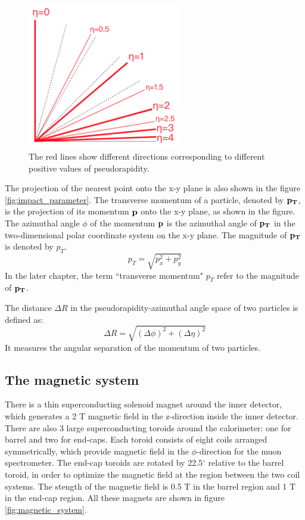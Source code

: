 \begin{figure}
\centering
\includegraphics[width=0.6\textwidth]{data/photo/detector/pseudorapidity.png}
\caption{The red lines show different directions corresponding to different positive values of pseudorapidity. \cite{pseudorapidity}}
\label{fig:pseudorapidity}
\end{figure}

The projection of the nearest point onto the x-y plane is also shown in the figure \ref{fig:impact_parameter}.
The transverse momentum of a particle, denoted by $\bf{p}_T$, is the projection of its momentum $\bf{p}$ onto the x-y plane, as shown in the figure.
The azimuthal angle $\phi$ of the momentum $\bf{p}$ is the azimuthal angle of $\bf{p}_T$ in the two-dimensional polar coordinate system on the x-y plane.
The magnitude of $\bf{p}_T$ is denoted by $p_T$.
\begin{equation}
p_T = \sqrt{p_x^2 + p_y^2}
\end{equation}
In the later chapter, the term ``transverse momentum" $p_T$ refer to the magnitude of $\bf{p}_T$.

The distance $\Delta R$ in the pseudorapidity-azimuthal angle space of two particles is defined as:
\begin{equation}
\Delta R = \sqrt{(\Delta \phi) ^2 + (\Delta \eta) ^2}
\end{equation}
It measures the angular separation of the momentum of two particles.

\subsection{The magnetic system}
\label{sec:magnetic_system}
There is a thin superconducting solenoid magnet around the inner detector, which generates a 2 T magnetic field in the z-direction inside the inner detector.
There are also 3 large superconducting toroids around the calorimeter: one for barrel and two for end-caps.
Each toroid consists of eight coils arranged symmetrically, which provide magnetic field in the $\phi$-direction for the muon spectrometer.
The end-cap toroids are rotated by 22.5$^{\circ}$ relative to the barrel toroid, in order to optimize the magnetic field at the region between the two coil systems.
The stength of the magnetic field is 0.5 T in the barrel region and 1 T in the end-cap region.
All these magnets are shown in figure \ref{fig:magnetic_system}.

